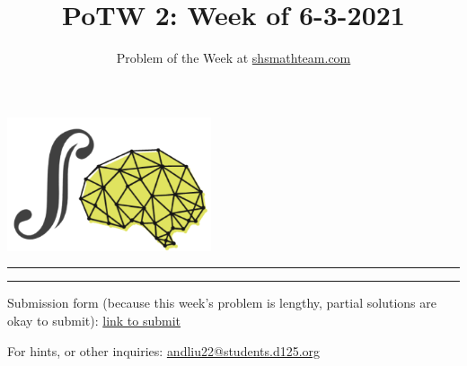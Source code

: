 \documentclass{article}
\title{{\fontfamily{lmss}\selectfont \vspace{-0.5cm}
\textbf{PoTW 2: Week of 6-3-2021}}}
\author{Problem of the Week at \href{https://shsmathteam.com/problem-of-the-week/}{shsmathteam.com}}
\date{}
\newcommand{\V}{

\vspace{\baselineskip}

}
\begin{document}
\noindent\hfill\includegraphics[width=6cm]{logo.png}\hfill\hfill\newline
\rule{\textwidth}{1pt} 

\setlength{\parindent}{0cm}
{\let\newpage\relax\maketitle}
\pagestyle{regular}


\vspace{-0.45cm}\rule{\textwidth}{1pt} \vspace{0.3cm}

{\large Submission form (because this week's problem is lengthy, partial solutions are okay to submit): \href{https://forms.gle/EHPS5WeVKvznCnp67}{link to submit}\V}

{\large For hints, or other inquiries: \href{mailto:andliu22@students.d125.org}{andliu22@students.d125.org}\V}
\end{document}
